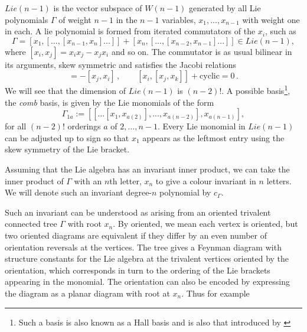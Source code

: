 \documentclass[11pt]{article}
\newcommand{\1}{{\rm 1\hskip-0.25em I}}
\begin{document}
$Lie(n-1)$ is the vector subspace of $W(n-1)$  generated by all Lie polynomials $\Gamma$ of weight $n-1$ in the $n-1$ variables, $x_1, ... , x_{n-1}$ with weight one in each.  A lie polynomial is formed from iterated commutators of the $x_i$, such as
$$
\Gamma=[x_1,[...,[x_{n-1},x_n]...]] + [x_n,[...,[x_{n-2},x_{n-1}]...]] \in Lie(n-1),
$$
where $[x_i,x_j]=x_ix_j-x_jx_i$ and so on.
 The commutator  is as usual bilinear in its arguments, skew symmetric and satisfies the Jacobi relations
\begin{equation}
[x_i,x_j]=-[x_j,x_i]\, , \qquad [x_i,[x_j,x_k]]+ \mbox {cyclic}=0\, .
\end{equation}
We will see that the dimension of $Lie(n-1)$ is $(n-2)!$.  A possible basis\footnote{Such a basis is also known as a Hall basis \cite{Hall:1950} and is also that introduced by \cite{DelDuca:1999rs}}, the \emph{comb} basis, is given by the Lie monomials of the form
\begin{equation}
\Gamma_{1a}:=[[\ldots [x_{1},x_{a(2)}],...,x_{a(n-2)}],x_{a(n-1)}], \label{comb}
\end{equation}
for all $(n-2)!$ orderings $a$ of $2,\ldots,n-1$. Every Lie monomial in $Lie(n-1)$ can be adjusted up to sign so that $x_1$ appears as the leftmost entry using the skew symmetry of the Lie bracket.


Assuming that the Lie algebra has an invariant inner product, we can take the inner product of $\Gamma$ with an $n$th letter, $x_n$ to give a colour invariant in $n$ letters. 
 We will denote such an invariant degree-$n$ polynomial by $c_\Gamma$.



Such an invariant can be understood as arising from an oriented trivalent connected tree $\Gamma$ with  root $x_n$.  By oriented, we mean each  vertex is oriented, but two oriented diagrams are equivalent if they differ by an even number of orientation reversals at the vertices.  The tree gives a Feynman diagram with structure constants for the Lie algebra at the trivalent vertices oriented by the orientation, which corresponds in turn to the ordering of the Lie brackets appearing in the monomial.  The orientation can also be encoded by expressing the diagram as a planar diagram with  root at $x_n$. Thus for example
\begin{adjustbox}{width=.8\textwidth
,center}%
\end{adjustbox}
\end{document}
